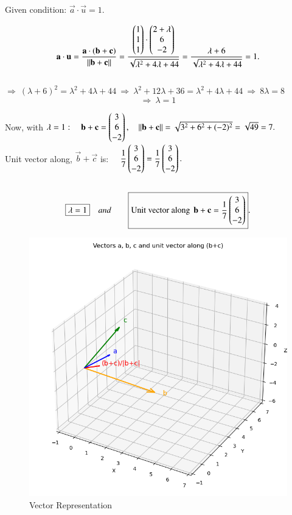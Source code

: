 \documentclass[journal]{IEEEtran}
\begin{document}
Given condition: $\vec{a}\cdot \vec{u}=1.$  

$$ \vec{a}\cdot\vec{u} = \dfrac{\vec{a}\cdot(\vec{b}+\vec{c})}{\|\vec{b}+\vec{c}\|}
= \dfrac{\myvec{1\\1\\1}\cdot\myvec{2+\lambda\\6\\-2}}
{\sqrt{\lambda^2+4\lambda+44}}
= \dfrac{\lambda+6}{\sqrt{\lambda^2+4\lambda+44}}=1.
$$ \\


$
\Rightarrow\ (\lambda+6)^2=\lambda^2+4\lambda+44
\ \Longrightarrow\ 
\lambda^2+12\lambda+36=\lambda^2+4\lambda+44
\ \Longrightarrow\ 
8\lambda=8\ $
$$\Longrightarrow\ 
\boxed{\lambda=1}$$

Now, with $\lambda=1:\quad \vec{b}+\vec{c}
=\myvec{3\\6\\-2},\quad \|\vec{b}+\vec{c}\|
=\sqrt{3^2+6^2+(-2)^2} = \sqrt{49} = 7.$ \\

Unit vector along, $\vec{b}+\vec{c}$ is: $\quad \dfrac{1}{7}\myvec{3\\6\\-2}
= \dfrac{1}{7}\myvec{3\\6\\-2}.$\\\\
\bigskip
\begin{align}   
\centering
\boxed{\lambda=1} \quad and \qquad 
\boxed{\text{Unit vector along }\,\vec{b}+\vec{c}
=\dfrac{1}{7}\myvec{3\\6\\-2}}.
\end{align}

\bigskip

\begin{figure}[htbp]
    \centering
    \includegraphics[width=0.8\linewidth]{figs/fig1.png}
    \caption{Vector Representation}
    \label{fig:fig/fig1.png}
\end{figure}
\end{document}
